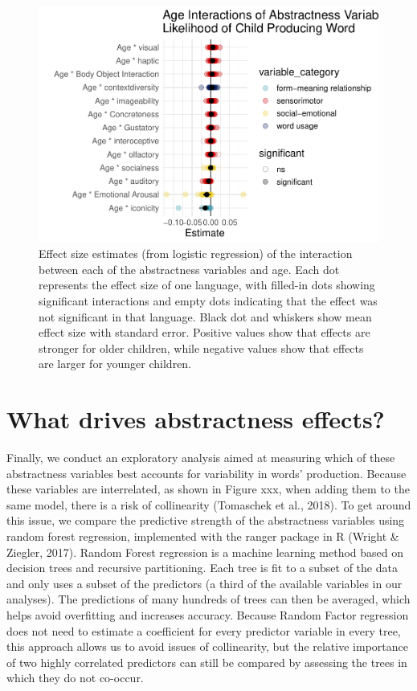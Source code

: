 \documentclass[
  man,floatsintext]{apa6}
\begin{document}
\begin{figure}
\centering
\includegraphics{crossling_abstractness_manuscript_files/figure-latex/summary-of-interactions-1.pdf}
\caption{\label{fig:summary-of-interactions}Effect size estimates (from logistic regression) of the interaction between each of the abstractness variables and age. Each dot represents the effect size of one language, with filled-in dots showing significant interactions and empty dots indicating that the effect was not significant in that language. Black dot and whiskers show mean effect size with standard error. Positive values show that effects are stronger for older children, while negative values show that effects are larger for younger children.}
\end{figure}

\hypertarget{what-drives-abstractness-effects}{%
\section{What drives abstractness effects?}\label{what-drives-abstractness-effects}}

Finally, we conduct an exploratory analysis aimed at measuring which of these abstractness variables best accounts for variability in words' production. Because these variables are interrelated, as shown in Figure xxx, when adding them to the same model, there is a risk of collinearity (Tomaschek et al., 2018). To get around this issue, we compare the predictive strength of the abstractness variables using random forest regression, implemented with the ranger package in R (Wright \& Ziegler, 2017). Random Forest regression is a machine learning method based on decision trees and recursive partitioning. Each tree is fit to a subset of the data and only uses a subset of the predictors (a third of the available variables in our analyses). The predictions of many hundreds of trees can then be averaged, which helps avoid overfitting and increases accuracy. Because Random Factor regression does not need to estimate a coefficient for every predictor variable in every tree, this approach allows us to avoid issues of collinearity, but the relative importance of two highly correlated predictors can still be compared by assessing the trees in which they do not co-occur.
\end{document}

